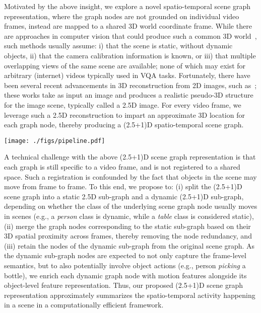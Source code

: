 \documentclass[letterpaper]{article} \usepackage{aaai22}  \usepackage{times}  \usepackage{helvet}  \usepackage{courier}  \usepackage[hyphens]{url}  \usepackage{graphicx} \urlstyle{rm} \def\UrlFont{\rm}  \usepackage{natbib}  \usepackage{caption} \DeclareCaptionStyle{ruled}{labelfont=normalfont,labelsep=colon,strut=off} \frenchspacing  \setlength{\pdfpagewidth}{8.5in}  \setlength{\pdfpageheight}{11in}  \usepackage{algorithm}
\newcommand{\name}{(2.5+1)D\xspace}
\begin{document}
Motivated by the above insight, we explore a novel spatio-temporal scene graph representation, where the graph nodes are not grounded on individual video frames, instead are mapped to a shared 3D world coordinate frame. While there are approaches in computer vision that could produce such a common 3D world~\cite{multiview}, such methods usually assume: i) that the scene is static, without dynamic objects,  ii) that the camera calibration information is known, or iii) that multiple overlapping views of the same scene are available; none of which may exist for arbitrary (internet) videos typically used in VQA tasks. Fortunately, there have been several recent advancements in 3D reconstruction from 2D images, such as~\cite{ranftl2019towards,fu2018deep}; these works take as input an image and produces a realistic pseudo-3D structure for the image scene, typically called a 2.5D image. For every video frame, we leverage such a 2.5D reconstruction to impart an approximate 3D location for each graph node, thereby producing a \name spatio-temporal scene graph.

\begin{figure*}[ht]
    \centering
    \texttt{[image: ./figs/pipeline.pdf]}
    \caption{A schematic illustration of our proposed \name video QA reasoning pipeline.}
    \label{fig:pipeline}
\end{figure*}
A technical challenge with the above \name scene graph representation is that each graph is still specific to a video frame, and is not registered to a shared space. Such a registration is confounded by the fact that objects in the scene may move from frame to frame. To this end, we propose to: (i) split the \name scene graph into a static 2.5D sub-graph and a dynamic \name sub-graph, depending on whether the class of the underlying scene graph node usually moves in scenes (e.g., a \emph{person} class is dynamic, while a \emph{table} class is considered static), (ii) merge the graph nodes corresponding to the static sub-graph based on their 3D spatial proximity across frames, thereby removing the node redundancy, and (iii) retain the nodes of the dynamic sub-graph from the original scene graph. As the dynamic sub-graph nodes are expected to not only capture the frame-level semantics, but to also potentially involve object actions (e.g., person \emph{picking} a bottle), we enrich each dynamic graph node with motion features alongside its object-level feature representation. Thus, our proposed \name scene graph representation approximately summarizes the spatio-temporal activity happening in a scene in a computationally efficient framework.
\end{document}
